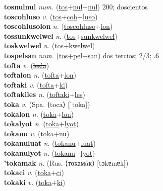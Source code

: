 \textbf{tosnulnul} \textit{num.} (\hyperref[tos]{tos}+\hyperref[nul]{nul}+\hyperref[nul]{nul})
200; doscientos \label{tosnulnul} \\
\textbf{toscohluso} \textit{v.} (\hyperref[tos]{tos}+\hyperref[coh]{coh}+\hyperref[luso]{luso})
 \label{toscohluso} \\
\textbf{toscohlusolon} \textit{n.} (\hyperref[toscohluso]{toscohluso}+\hyperref[lon]{lon})
 \label{toscohlusolon} \\
\textbf{tossunkwelwel} \textit{n.} (\hyperref[tos]{tos}+\hyperref[sunkwelwel]{sunkwelwel})
 \label{tossunkwelwel} \\
\textbf{toskwelwel} \textit{n.} (\hyperref[tos]{tos}+\hyperref[kwelwel]{kwelwel})
 \label{toskwelwel} \\
\textbf{tospelsan} \textit{num.} (\hyperref[tos]{tos}+\hyperref[pel]{pel}+\hyperref[san]{san})
dos tercios; 2/3; .̅6 \label{tospelsan} \\
\textbf{tofta} \textit{v.} (\hyperref[lesla]{\sout{lesla}})
 \label{tofta} \\
\textbf{toftalon} \textit{n.} (\hyperref[tofta]{tofta}+\hyperref[lon]{lon})
 \label{toftalon} \\
\textbf{toftaki} \textit{v.} (\hyperref[tofta]{tofta}+\hyperref[ki]{ki})
 \label{toftaki} \\
\textbf{toftakiles} \textit{n.} (\hyperref[toftaki]{toftaki}+\hyperref[les]{les})
 \label{toftakiles} \\
\textbf{toka} \textit{v.} (Spa. ⟨toca⟩ [ˈtoka])
 \label{toka} \\
\textbf{tokalon} \textit{n.} (\hyperref[toka]{toka}+\hyperref[lon]{lon})
 \label{tokalon} \\
\textbf{tokalyot} \textit{n.} (\hyperref[toka]{toka}+\hyperref[lyot]{lyot})
 \label{tokalyot} \\
\textbf{tokanu} \textit{v.} (\hyperref[toka]{toka}+\hyperref[nu]{nu})
 \label{tokanu} \\
\textbf{tokanuluat} \textit{n.} (\hyperref[tokanu]{tokanu}+\hyperref[luat]{luat})
 \label{tokanuluat} \\
\textbf{tokanulyot} \textit{n.} (\hyperref[tokanu]{tokanu}+\hyperref[lyot]{lyot})
 \label{tokanulyot} \\
\textbf{'tokamak} \textit{n.} (Rus. ⟨токамáк⟩ [tɔkɐmɐk])
 \label{'tokamak} \\
\textbf{tokaci} \textit{v.} (\hyperref[toka]{toka}+\hyperref[ci]{ci})
 \label{tokaci} \\
\textbf{tokaki} \textit{v.} (\hyperref[toka]{toka}+\hyperref[ki]{ki})
